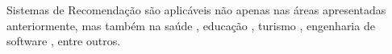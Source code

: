     
Sistemas de Recomendação são aplicáveis não apenas nas áreas apresentadas anteriormente, mas também na saúde \cite{Ferretto2017}, educação \cite{Wai2016,Montuschi2015}, turismo \cite{Smirnov2013, Frikha2016}, engenharia de software \cite{Hamza2015}, entre outros.



